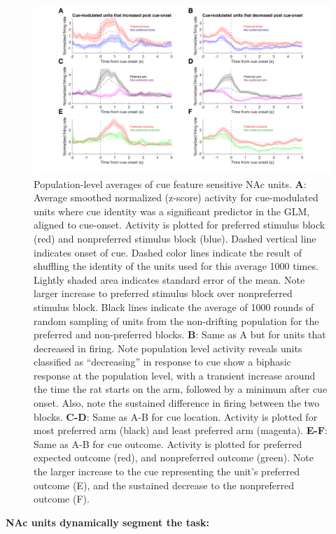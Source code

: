 \documentclass[11pt]{article}
\newcommand{\bsf}[1]{\textbf{#1}}
\begin{document}
\begin{figure}[h]
\centering
\includegraphics[width=\textwidth]{Fig 7 - Population averages.png}
\caption{Population-level averages of cue feature sensitive NAc units. \bsf{A}:
  Average smoothed normalized (z-score) activity for cue-modulated units where
  cue identity was a significant predictor in the GLM, aligned to
  cue-onset. Activity is plotted for preferred stimulus block (red) and
  nonpreferred stimulus block (blue). Dashed vertical line indicates onset of
  cue. Dashed color lines indicate the result of shuffling the identity of the units used for this average 1000 times. Lightly shaded area indicates standard error of the mean. Note larger
  increase to preferred stimulus block over nonpreferred stimulus block. Black
  lines indicate the average of 1000 rounds of random sampling of units from the
  non-drifting population for the preferred and non-preferred blocks. \bsf{B}:
  Same as A but for units that decreased in firing. Note population level
  activity reveals units classified as “decreasing” in response to cue show a
  biphasic response at the population level, with a transient increase around
  the time the rat starts on the arm, followed by a minimum after cue
  onset. Also, note the sustained difference in firing between the two
  blocks. \bsf{C-D}: Same as A-B for cue location. Activity is plotted for
  most preferred arm (black) and least preferred arm (magenta). \bsf{E-F}: Same as A-B for cue outcome. Activity is
  plotted for preferred expected outcome (red), and nonpreferred outcome
  (green). Note the larger increase to the cue representing the unit’s preferred
  outcome (E), and the sustained decrease to the nonpreferred outcome (F).}
\label{fig:pop}
\end{figure}
{\bf NAc units dynamically segment the task:}
\end{document}
